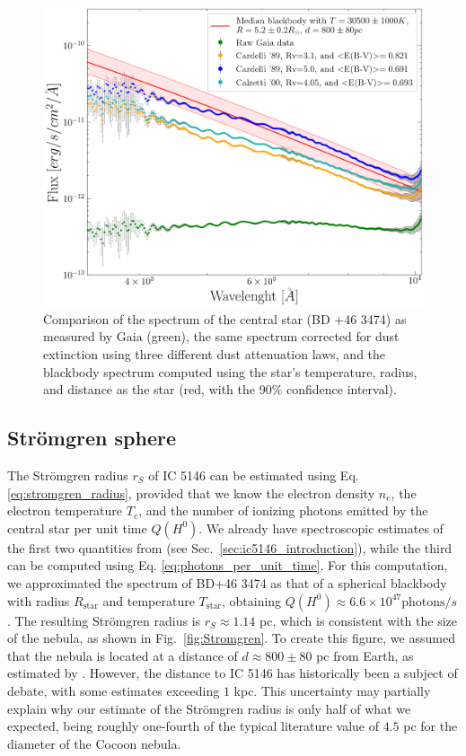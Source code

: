 \documentclass[fleqn,usenatbib]{mnras}
\begin{document}
\begin{figure}\centering
	\includegraphics[width=0.9\columnwidth]{Spectrum_star_loglog.png}
    \caption{Comparison of the spectrum of the central star (BD +46 3474) as measured by Gaia (green), the same spectrum corrected for dust extinction using three different dust attenuation laws, and the blackbody spectrum computed using the star's temperature, radius, and distance as the star (red, with the 90$\%$ confidence interval).}
    \label{fig:Spectrum_star}
\end{figure}

\subsection{Strömgren sphere}\label{sec:stromgren_results}
The Strömgren radius $r_S$ of IC 5146 can be estimated using Eq. \ref{eq:stromgren_radius}, provided that we know the electron density $n_e$, the electron temperature $T_e$, and the number of ionizing photons emitted by the central star per unit time $Q (H^0)$.
We already have spectroscopic estimates of the first two quantities from \cite{Garcia-Rojas_2014} (see Sec.~\ref{sec:ic5146_introduction}), while the third can be computed using Eq. \ref{eq:photons_per_unit_time}.
For this computation, we approximated the spectrum of BD+46 3474 as that of a spherical blackbody with radius $R_\text{star}$ and temperature $T_\text{star}$, obtaining $Q (H^0) \approx 6.6 \times 10^{47} \text{photons}/s$.
The resulting Strömgren radius is $r_S \approx 1.14$ pc, which is consistent with the size of the nebula, as shown in Fig.~\ref{fig:Stromgren}. 
To create this figure, we assumed that the nebula is located at a distance of $d \approx 800 \pm 80$ pc from Earth, as estimated by \cite{Garcia-Rojas_2014}.
However, the distance to IC 5146 has historically been a subject of debate, with some estimates exceeding $1$ kpc.
This uncertainty may partially explain why our estimate of the Strömgren radius is only half of what we expected, being roughly one-fourth of the typical literature value of $4.5$ pc for the diameter of the Cocoon nebula.
\end{document}
